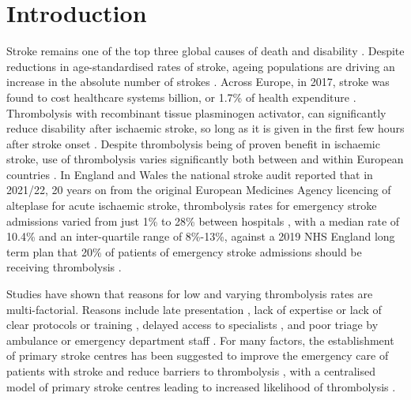 \section{Introduction}



Stroke remains one of the top three global causes of death and disability \cite{feigin_global_2021}. Despite reductions in age-standardised rates of stroke, ageing populations are driving an increase in the absolute number of strokes \cite{feigin_global_2021}. Across Europe, in 2017, stroke was found to cost healthcare systems  billion, or 1.7\% of health expenditure \cite{luengo-fernandez_economic_2020}. Thrombolysis with recombinant tissue plasminogen activator, can significantly reduce disability after ischaemic stroke, so long as it is given in the first few hours after stroke onset \cite{emberson_effect_2014}. Despite thrombolysis being of proven benefit in ischaemic stroke, use of thrombolysis varies significantly both between and within European countries \cite{aguiar_de_sousa_access_2019}. In England and Wales the national stroke audit reported that in 2021/22, 20 years on from the original European Medicines Agency licencing of alteplase for acute ischaemic stroke, thrombolysis rates for emergency stroke admissions varied from just 1\% to 28\% between hospitals \cite{sentinel_national_stroke_audit_programme_ssnap_2022}, with a median rate of 10.4\% and an inter-quartile range of 8\%-13\%, against a 2019 NHS England long term plan that 20\% of patients of emergency stroke admissions should be receiving thrombolysis \cite{nhs_long_term_plan_2019}.


Studies have shown that reasons for low and varying thrombolysis rates are multi-factorial. Reasons include late presentation \cite{aguiar_de_sousa_access_2019}, lack of expertise \cite{aguiar_de_sousa_access_2019} or lack of clear protocols or training \cite{carter-jones_stroke_2011}, delayed access to specialists \cite{kamal_delays_2017}, and poor triage by ambulance or emergency department staff \cite{carter-jones_stroke_2011}. For many factors, the establishment of primary stroke centres has been suggested to improve the emergency care of patients with stroke and reduce barriers to thrombolysis \cite{carter-jones_stroke_2011}, with a centralised model of primary stroke centres leading to increased likelihood of thrombolysis \cite{lahr_proportion_2012, morris_impact_2014, hunter_impact_2013}. 

